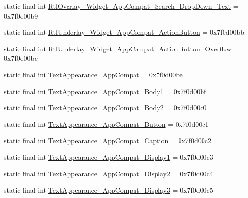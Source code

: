 \begin{DoxyCompactItemize}
\item 
static final int \mbox{\hyperlink{classcom_1_1synnapps_1_1carouselview_1_1_r_1_1style_af456f41c582889a631b03b937bb53765}{Rtl\+Overlay\+\_\+\+Widget\+\_\+\+App\+Compat\+\_\+\+Search\+\_\+\+Drop\+Down\+\_\+\+Text}} = 0x7f0d00b9
\item 
static final int \mbox{\hyperlink{classcom_1_1synnapps_1_1carouselview_1_1_r_1_1style_a4a34854f5afe718756e94646b47988f8}{Rtl\+Underlay\+\_\+\+Widget\+\_\+\+App\+Compat\+\_\+\+Action\+Button}} = 0x7f0d00bb
\item 
static final int \mbox{\hyperlink{classcom_1_1synnapps_1_1carouselview_1_1_r_1_1style_a603f38f43c4d3deb72a6dd0fc8df1df3}{Rtl\+Underlay\+\_\+\+Widget\+\_\+\+App\+Compat\+\_\+\+Action\+Button\+\_\+\+Overflow}} = 0x7f0d00bc
\item 
static final int \mbox{\hyperlink{classcom_1_1synnapps_1_1carouselview_1_1_r_1_1style_a5aa05b0ba0bc851757562785c82e2d14}{Text\+Appearance\+\_\+\+App\+Compat}} = 0x7f0d00be
\item 
static final int \mbox{\hyperlink{classcom_1_1synnapps_1_1carouselview_1_1_r_1_1style_acccff4dcb383a470d0d6e956f52aaf16}{Text\+Appearance\+\_\+\+App\+Compat\+\_\+\+Body1}} = 0x7f0d00bf
\item 
static final int \mbox{\hyperlink{classcom_1_1synnapps_1_1carouselview_1_1_r_1_1style_a4ab5e7a6e01dbb49d440727d4b4c81ec}{Text\+Appearance\+\_\+\+App\+Compat\+\_\+\+Body2}} = 0x7f0d00c0
\item 
static final int \mbox{\hyperlink{classcom_1_1synnapps_1_1carouselview_1_1_r_1_1style_ad9f5ea817328f7d4736272c4bc4eb7ee}{Text\+Appearance\+\_\+\+App\+Compat\+\_\+\+Button}} = 0x7f0d00c1
\item 
static final int \mbox{\hyperlink{classcom_1_1synnapps_1_1carouselview_1_1_r_1_1style_a473d186f54bcb97a6a0baa7c32dda847}{Text\+Appearance\+\_\+\+App\+Compat\+\_\+\+Caption}} = 0x7f0d00c2
\item 
static final int \mbox{\hyperlink{classcom_1_1synnapps_1_1carouselview_1_1_r_1_1style_ae74922f3e66519612ca2cd8d22296554}{Text\+Appearance\+\_\+\+App\+Compat\+\_\+\+Display1}} = 0x7f0d00c3
\item 
static final int \mbox{\hyperlink{classcom_1_1synnapps_1_1carouselview_1_1_r_1_1style_aeb906ebf1a797bc742f66710e4655303}{Text\+Appearance\+\_\+\+App\+Compat\+\_\+\+Display2}} = 0x7f0d00c4
\item 
static final int \mbox{\hyperlink{classcom_1_1synnapps_1_1carouselview_1_1_r_1_1style_a6984f3f37bf5752c1dc6bfd87e1ce2f6}{Text\+Appearance\+\_\+\+App\+Compat\+\_\+\+Display3}} = 0x7f0d00c5

\end{DoxyCompactItemize}
